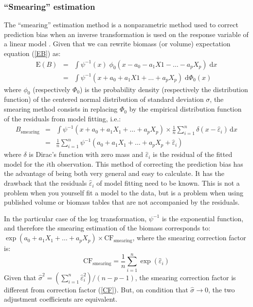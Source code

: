\subsubsection{``Smearing'' estimation}

The ``smearing'' estimation method is a nonparametric method used to correct prediction bias when an inverse transformation is used on the response variable of a linear model 
\citep{duan83,taylor86,manning01}. Given that we can rewrite biomass (or volume) expectation equation (\ref{EB}) as:
\begin{eqnarray*}
\mathrm{E}(B) &=&
\int\psi^{-1}(x)\;\phi_0(x-a_0-a_1X1-\ldots-a_pX_p)\;\mathrm{d}x
\\ &=&
\int\psi^{-1}(x+a_0+a_1X1+\ldots+a_pX_p)\;\mathrm{d}\Phi_0(x)
\end{eqnarray*}
where $\phi_0$ (respectively $\Phi_0$) is the probability density (respectively the distribution function) of the centered normal distribution of standard deviation $\sigma$, the smearing method consists in replacing $\Phi_0$ by the empirical distribution function of the residuals from model fitting, i.e.:
\begin{eqnarray*}
B_{\mathrm{smearing}} &=&
\int\psi^{-1}(x+a_0+a_1X_1+\ldots+a_pX_p)\times\frac{1}{n}\sum_{i=1}^n\delta
(x-\hat{\varepsilon}_i)\,\mathrm{d}x
\\ &=& \frac{1}{n}\sum_{i=1}^n\psi^{-1}(a_0+a_1X_1+\ldots+a_pX_p+
\hat{\varepsilon}_i)
\end{eqnarray*}
where $\delta$ is Dirac's function with zero mass and $\hat{\varepsilon}_i$
is the residual of the fitted model for the $i$th
observation. This method of correcting the prediction bias has the advantage of being both very general and easy to calculate. It has the drawback that the residuals 
$\hat{\varepsilon}_i$ of model fitting need to be known. This is not a problem when you yourself fit a model to the data, but is a problem when using published volume or biomass tables that are not accompanied by the residuals.

In the particular case of the log transformation,
$\psi^{-1}$ is the exponential function, and therefore the smearing estimation of the biomass corresponds to: 
$\exp(a_0+a_1X_1+\ldots+a_pX_p)\times\mathrm{CF}_{\mathrm{smearing}}$,
where the smearing correction factor is:
\[
\mathrm{CF}_{\mathrm{smearing}}=\frac{1}{n}\sum_{i=1}^n\exp(\hat{\varepsilon}_i)
\]
Given that 
$\hat{\sigma}^2=(\sum_{i=1}^n\hat{\varepsilon}_i^2)/(n-p-1)$, the smearing correction factor is different from correction factor (\ref{CF}). But, on condition that 
$\hat{\sigma}\rightarrow0$, the two adjustment coefficients are equivalent.


